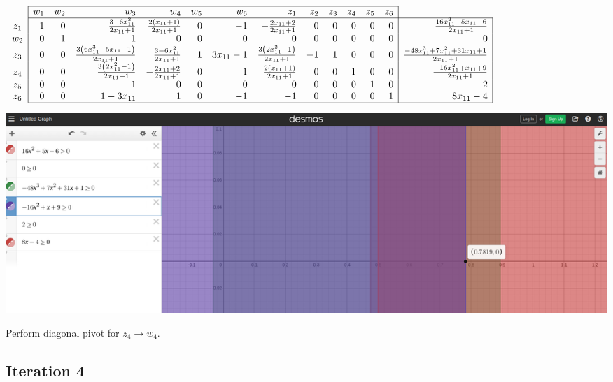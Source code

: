 \documentclass[12pt]{article}
\begin{document}
$\begin{array}{c|rrrrrrrrrrrr|r|}
\cline{2-13}
& w_1 & w_2 & w_3 & w_4 & w_5 & w_6 & z_1 & z_2 & z_3 & z_4 & z_5 & z_6 \\
\cline{2-14}
z_1 & 1 & 0 & \frac{3 - 6 x_{11}^{2}}{2 x_{11} + 1} & \frac{2 \left(x_{11} + 1\right)}{2 x_{11} + 1} & 0 & -1 & - \frac{2 x_{11} + 2}{2 x_{11} + 1} & 0 & 0 & 0& 0 & 0 & \frac{16 x_{11}^{2} + 5 x_{11} - 6}{2 x_{11} + 1} \\
w_2 & 0 & 1 & 1 & 0 & 0 & 0 & 0 & 0 & 0 & 0 & 0 & 0 & 0 \\
z_3 & 0 & 0 & \frac{3 \left(6 x_{11}^{3} - 5 x_{11} - 1\right)}{2 x_{11} + 1} & \frac{3 - 6 x_{11}^{2}}{2 x_{11} + 1} & 1 & 3 x_{11} - 1 & \frac{3 \left(2 x_{11}^{2} - 1\right)}{2 x_{11} + 1} & -1 & 1 & 0 & 0 & 0 & \frac{- 48 x_{11}^{3} + 7 x_{11}^{2} + 31 x_{11} + 1}{2 x_{11} + 1} \\
z_4 & 0 & 0 & \frac{3 \left(2 x_{11}^{2} - 1\right)}{2 x_{11} + 1} & - \frac{2 x_{11} + 2}{2 x_{11} + 1} & 0 & 1 & \frac{2 \left(x_{11} + 1\right)}{2 x_{11} + 1} & 0 & 0 & 1 & 0 & 0 & \frac{- 16 x_{11}^{2} + x_{11} + 9}{2 x_{11} + 1} \\
z_5 & 0 & 0 & -1 & 0 & 0 & 0 & 0 & 0 & 0 & 0 & 1 & 0 & 2 \\
z_6 & 0 & 0 & 1 - 3 x_{11} & 1 & 0 & -1 & -1 & 0 & 0 & 0 & 0 & 1 & 8 x_{11} - 4 \\
\cline{2-14}
\end{array}$

\begin{center}
\includegraphics[scale=.3]{Phase2_iteration3_visual}
\end{center}

Perform diagonal pivot for $z_4 \rightarrow w_4$.

\subsection*{Iteration 4}
\end{document}
